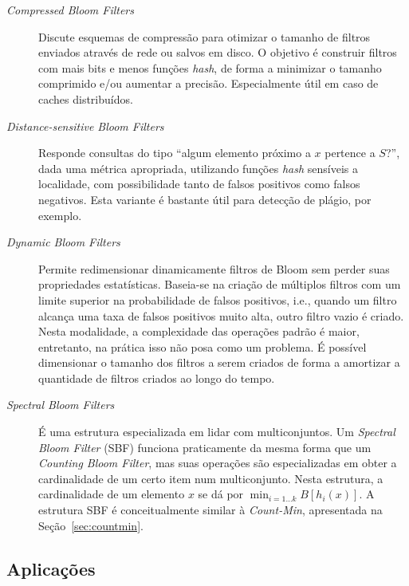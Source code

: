 \begin{description}

  \item[\emph{Compressed Bloom Filters} \cite{mitzenmacher2002compressed}] 
    Discute esquemas de compressão para otimizar o tamanho de filtros enviados através de rede ou salvos em disco. O objetivo é construir filtros com mais bits e menos funções \emph{hash}, de forma a minimizar o tamanho comprimido e/ou aumentar a precisão. Especialmente útil em caso de caches distribuídos. 

  \item[\emph{Distance-sensitive Bloom Filters} \cite{kirsch2006distance}] 
    Responde consultas do tipo ``algum elemento próximo a $x$ pertence a $S$?'', dada uma métrica apropriada, utilizando funções \emph{hash} sensíveis a localidade, com possibilidade tanto de falsos positivos como falsos negativos. Esta variante é bastante útil para detecção de plágio, por exemplo.

  \item[\emph{Dynamic Bloom Filters} \cite{guo2010dynamic}] 
    Permite redimensionar dinamicamente filtros de Bloom sem perder suas propriedades estatísticas. Baseia-se na criação de múltiplos filtros com um limite superior na probabilidade de falsos positivos, i.e., quando um filtro alcança uma taxa de falsos positivos muito alta, outro filtro vazio é criado. Nesta modalidade, a complexidade das operações padrão é maior, entretanto, na prática isso não posa como um problema. É possível dimensionar o tamanho dos filtros a serem criados de forma a amortizar a quantidade de filtros criados ao longo do tempo.

  \item[\emph{Spectral Bloom Filters} \cite{cohen2003spectral}] 
    É uma estrutura especializada em lidar com multiconjuntos. Um \emph{Spectral Bloom Filter} (SBF) funciona praticamente da mesma forma que um \emph{Counting Bloom Filter}, mas suas operações são especializadas em obter a cardinalidade de um certo item num multiconjunto. Nesta estrutura, a cardinalidade de um elemento $x$ se dá por $\displaystyle \min_{i = 1 \dots k} B[h_i(x)]$. A estrutura SBF é conceitualmente similar à \emph{Count-Min}, apresentada na Seção~\ref{sec:countmin}.

\end{description}


\subsection{Aplicações}\label{sec:bloom:apps}

